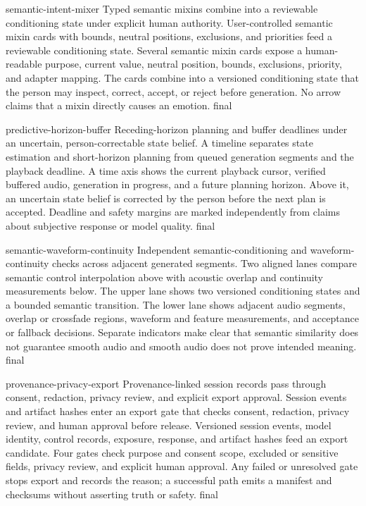 \AntidoteDeclareVisualText
  {semantic-intent-mixer}
  {Typed semantic mixins combine into a reviewable conditioning state under explicit human authority.}
  {User-controlled semantic mixin cards with bounds, neutral positions, exclusions, and priorities feed a reviewable conditioning state.}
  {Several semantic mixin cards expose a human-readable purpose, current value, neutral position, bounds, exclusions, priority, and adapter mapping. The cards combine into a versioned conditioning state that the person may inspect, correct, accept, or reject before generation. No arrow claims that a mixin directly causes an emotion.}
  {final}

\AntidoteDeclareVisualText
  {predictive-horizon-buffer}
  {Receding-horizon planning and buffer deadlines under an uncertain, person-correctable state belief.}
  {A timeline separates state estimation and short-horizon planning from queued generation segments and the playback deadline.}
  {A time axis shows the current playback cursor, verified buffered audio, generation in progress, and a future planning horizon. Above it, an uncertain state belief is corrected by the person before the next plan is accepted. Deadline and safety margins are marked independently from claims about subjective response or model quality.}
  {final}

\AntidoteDeclareVisualText
  {semantic-waveform-continuity}
  {Independent semantic-conditioning and waveform-continuity checks across adjacent generated segments.}
  {Two aligned lanes compare semantic control interpolation above with acoustic overlap and continuity measurements below.}
  {The upper lane shows two versioned conditioning states and a bounded semantic transition. The lower lane shows adjacent audio segments, overlap or crossfade regions, waveform and feature measurements, and acceptance or fallback decisions. Separate indicators make clear that semantic similarity does not guarantee smooth audio and smooth audio does not prove intended meaning.}
  {final}

\AntidoteDeclareVisualText
  {provenance-privacy-export}
  {Provenance-linked session records pass through consent, redaction, privacy review, and explicit export approval.}
  {Session events and artifact hashes enter an export gate that checks consent, redaction, privacy review, and human approval before release.}
  {Versioned session events, model identity, control records, exposure, response, and artifact hashes feed an export candidate. Four gates check purpose and consent scope, excluded or sensitive fields, privacy review, and explicit human approval. Any failed or unresolved gate stops export and records the reason; a successful path emits a manifest and checksums without asserting truth or safety.}
  {final}

